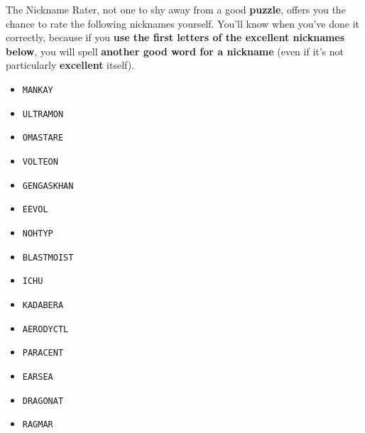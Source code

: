 The Nickname Rater, not one to shy away from a good \textbf{puzzle},
offers you the chance to rate the following nicknames yourself.
You'll know when you've done it correctly, because
if you \textbf{use the first letters of the excellent
nicknames below}, you will spell \textbf{another good word for a nickname}
(even if it's not particularly \textbf{excellent} itself).


\begin{multicols}{3}
  \begin{itemize}
    \item \texttt{MANKAY} %
    \item \texttt{ULTRAMON} %
    \item \texttt{OMASTARE} %
    \item \texttt{VOLTEON} %
    \item \texttt{GENGASKHAN} %
    \item \texttt{EEVOL} %
    \item \texttt{NOHTYP} %
    \item \texttt{BLASTMOIST} %
    \item \texttt{ICHU} %
    \item \texttt{KADABERA} %
    \item \texttt{AERODYCTL} %
    \item \texttt{PARACENT} %
    \item \texttt{EARSEA} %
    \item \texttt{DRAGONAT} %
    \item \texttt{RAGMAR} %
  \end{itemize}
\end{multicols}

